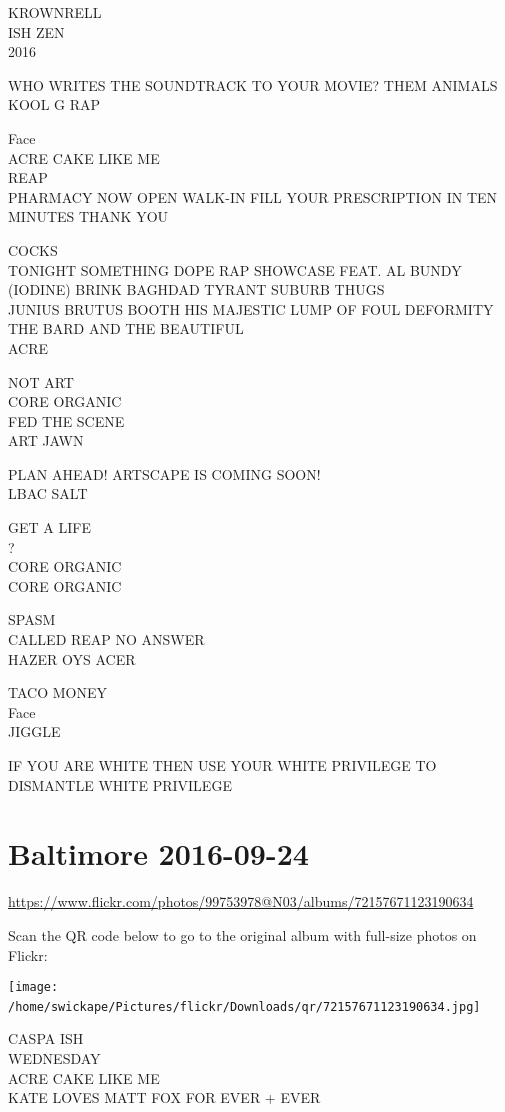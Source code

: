 \documentclass[10pt,letterpaper]{article}
\begin{document}
KROWNRELL\\
ISH ZEN\\
2016

WHO WRITES THE SOUNDTRACK TO YOUR MOVIE?  THEM ANIMALS\\
KOOL G RAP

Face\\
ACRE CAKE LIKE ME\\
REAP\\
PHARMACY NOW OPEN WALK{-}IN FILL YOUR PRESCRIPTION IN TEN MINUTES THANK YOU

COCKS\\
TONIGHT SOMETHING DOPE RAP SHOWCASE FEAT. AL BUNDY (IODINE) BRINK BAGHDAD TYRANT SUBURB THUGS\\
JUNIUS BRUTUS BOOTH HIS MAJESTIC LUMP OF FOUL DEFORMITY THE BARD AND THE BEAUTIFUL\\
ACRE

NOT ART\\
CORE ORGANIC\\
FED THE SCENE\\
ART JAWN

PLAN AHEAD!  ARTSCAPE IS COMING SOON!\\
LBAC SALT

GET A LIFE\\
?\\
CORE ORGANIC\\
CORE ORGANIC

SPASM\\
CALLED REAP NO ANSWER\\
HAZER OYS ACER

TACO MONEY\\
Face\\
JIGGLE

IF YOU ARE WHITE THEN USE YOUR WHITE PRIVILEGE TO DISMANTLE WHITE PRIVILEGE
\

\section*{Baltimore 2016-09-24}

\url{https://www.flickr.com/photos/99753978@N03/albums/72157671123190634}

Scan the QR code below to go to the original album with full-size photos on Flickr:

\texttt{[image: /home/swickape/Pictures/flickr/Downloads/qr/72157671123190634.jpg]}
\

CASPA ISH\\
WEDNESDAY\\
ACRE CAKE LIKE ME\\
KATE LOVES MATT FOX FOR EVER + EVER
\end{document}
